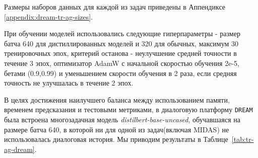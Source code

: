 Размеры наборов данных для каждой из задач приведены в Аппендиксе \ref{appendix:dream-tr-ag-sizes}. 

При обучении моделей использовались следующие гиперпараметры - размер батча 640 для дистиллированных моделей и 320 для обычных, максимум 30 тренировочных эпох, критерий останова - неулучшение средней точности в течение 3 эпох, оптимизатор AdamW с начальной скоростью обучения 2e-5, бетами (0.9,0.99) и уменьшением скорости обучения в 2 раза, если средняя точность не улучшалась в течение 2 эпох. 

В целях достижения наилучшего баланса между использованием памяти, временем предсказания и тестовыми метриками, в диалоговую платформу \texttt{DREAM} была встроена многозадачная модель \textit{distilbert-base-uncased}, обучавшаяся на размере батча 640, в которой ни для одной из задач(включая MIDAS) не использовалась диалоговая история.
Мы приводим результаты в Таблице~\ref{tab:tr-ag-dream}.

